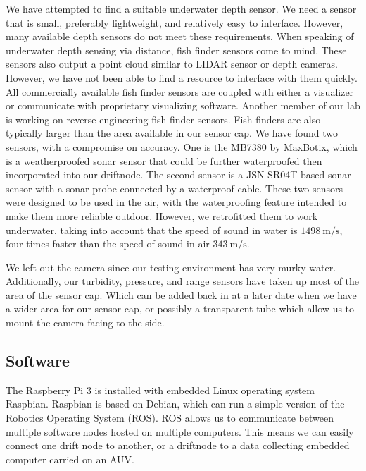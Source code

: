 We have attempted to find a suitable underwater depth sensor.
We need a sensor that is small, preferably lightweight, and relatively easy to interface.
However, many available depth sensors do not meet these requirements.
When speaking of underwater depth sensing via distance, fish finder sensors come to mind.
These sensors also output a point cloud similar to LIDAR sensor or depth cameras.
However, we have not been able to find a resource to interface with them quickly.
All commercially available fish finder sensors are coupled with either a visualizer or communicate with proprietary visualizing software.
Another member of our lab is working on reverse engineering fish finder sensors.
Fish finders are also typically larger than the area available in our sensor cap.
We have found two sensors, with a compromise on accuracy.
One is the MB7380 by MaxBotix, which is a weatherproofed sonar sensor that could be further waterproofed then incorporated into our driftnode.
The second sensor is a JSN-SR04T based sonar sensor with a sonar probe connected by a waterproof cable.
These two sensors were designed to be used in the air, with the waterproofing feature intended to make them more reliable outdoor.
However, we retrofitted them to work underwater, taking into account that the speed of sound in water is $\SI{1498}{\metre/\second}$, four times faster than the speed of sound in air $\SI{343}{\metre/\second}$.

We left out the camera since our testing environment has very murky water.
Additionally, our turbidity, pressure, and range sensors have taken up most of the area of the sensor cap.
Which can be added back in at a later date when we have a wider area for our sensor cap, or possibly a transparent tube which allow us to mount the camera facing to the side.

\subsection[Software]{Software}

The Raspberry Pi 3 is installed with embedded Linux operating system Raspbian.
Raspbian is based on Debian, which can run a simple version of the Robotics Operating System (ROS).
ROS allows us to communicate between multiple software nodes hosted on multiple computers.
This means we can easily connect one drift node to another, or a driftnode to a data collecting embedded computer carried on an AUV.

